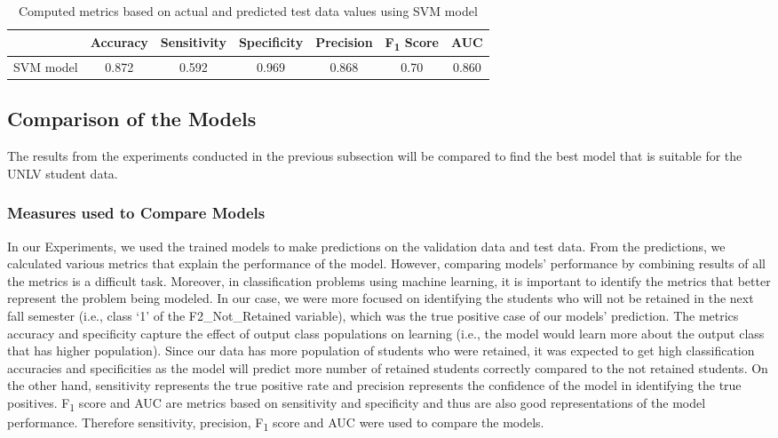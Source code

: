 \documentclass[11pt,openright]{report}
\begin{document}
\begin{table}[!htb]
	\renewcommand{\arraystretch}{1.3}
	\caption{Computed metrics based on actual and predicted test data values using SVM model}
	\label{table:SVM-unseen_metrics_db}
	\centering
	\begin{tabular}{|c|c|c|c|c|c|c|}
    \hline
  	 & \bfseries Accuracy & \bfseries Sensitivity & \bfseries Specificity & \bfseries Precision & \bfseries F\textsubscript{1} Score  & \bfseries AUC\\  
    \hline
	SVM model & 0.872 & 0.592 & 0.969 & 0.868 & 0.70 & 0.860 \\ \hline
	\end{tabular} 
\end{table}


\subsection {Comparison of the Models}

The results from the experiments conducted in the previous subsection will be compared to find the best model that is suitable for the UNLV student data. 

\subsubsection {Measures used to Compare Models}

In our Experiments, we used the trained models to make predictions on the validation data and test data. From the predictions, we calculated various metrics that explain the performance of the model. However, comparing models' performance by combining results of all the metrics is a difficult task. Moreover, in classification problems using machine learning, it is important to identify the metrics that better represent the problem being modeled. In our case, we were more focused on identifying the students who will not be retained in the next fall semester (i.e., class `1' of the F2\_Not\_Retained variable), which was the true positive case of our models' prediction. The metrics accuracy and specificity capture the effect of output class populations on learning (i.e., the model would learn more about the output class that has higher population). Since our data has more population of students who were retained, it was expected to get high classification accuracies and specificities as the model will predict more number of retained students correctly compared to the not retained students. On the other hand, sensitivity represents the true positive rate and precision represents the confidence of the model in identifying the true positives. F\textsubscript{1} score and AUC are metrics based on sensitivity and specificity and thus are also good representations of the model performance. Therefore sensitivity, precision, F\textsubscript{1} score and AUC were used to compare the models.
\end{document}
